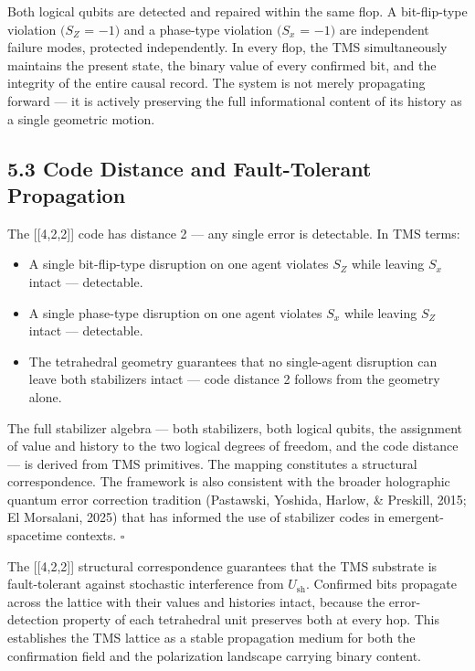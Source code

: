 \documentclass[11pt,oneside]{report}
\theoremstyle{definition}
\theoremstyle{remark}
\begin{document}
Both logical qubits are detected and repaired within the same flop. A
bit-flip-type violation \ensuremath{(S_{Z}} = \ensuremath{-1)} and a phase-type violation \ensuremath{(S_{x}} = \ensuremath{-1)}
are independent failure modes, protected independently. In every flop,
the TMS simultaneously maintains the present state, the binary value of
every confirmed bit, and the integrity of the entire causal record. The
system is not merely propagating forward --- it is actively preserving
the full informational content of its history as a single geometric
motion.

\subsection*{5.3 Code Distance and Fault-Tolerant Propagation}

The [[4,2,2]] code has distance 2 --- any single error is
detectable. In TMS terms:

\begin{itemize}
\item
  A single bit-flip-type disruption on one agent violates \ensuremath{S_{Z}} while
  leaving \ensuremath{S_{x}} intact --- detectable.
\item
  A single phase-type disruption on one agent violates \ensuremath{S_{x}} while leaving
  \ensuremath{S_{Z}} intact --- detectable.
\item
  The tetrahedral geometry guarantees that no single-agent disruption
  can leave both stabilizers intact --- code distance 2 follows from the
  geometry alone.
\end{itemize}

The full stabilizer algebra --- both stabilizers, both logical qubits,
the assignment of value and history to the two logical degrees of
freedom, and the code distance --- is derived from TMS primitives. The
mapping constitutes a structural correspondence. The framework is also
consistent with the broader holographic quantum error correction
tradition (Pastawski, Yoshida, Harlow, \& Preskill, 2015; El Morsalani,
2025) that has informed the use of stabilizer codes in
emergent-spacetime contexts. \hfill\ensuremath{\square}

The [[4,2,2]] structural correspondence guarantees that the TMS
substrate is fault-tolerant against stochastic interference from \ensuremath{U_{\mathrm{sh}}.}
Confirmed bits propagate across the lattice with their values and
histories intact, because the error-detection property of each
tetrahedral unit preserves both at every hop. This establishes the TMS
lattice as a stable propagation medium for both the confirmation field
and the polarization landscape carrying binary content.
\end{document}
